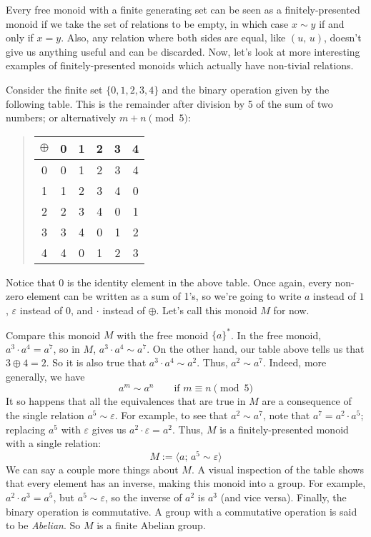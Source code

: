 \documentclass[../generics]{subfiles}
\begin{document}
Every free monoid with a finite generating set can be seen as a finitely-presented monoid if we take the set of relations to be empty, in which case $x\sim y$ if and only if $x=y$. Also, any relation where both sides are equal, like $(u,\,u)$, doesn't give us anything useful and can be discarded. Now, let's look at more interesting examples of finitely-presented monoids which actually have non-tivial relations.
\begin{example}
Consider the finite set $\{0,1,2,3,4\}$ and the binary operation given by the following table. This is the remainder after division by 5 of the sum of two numbers; or alternatively $m+n \pmod 5$:
\begin{quote}
\begin{tabular}{c|c|c|c|c|c}
$\oplus$&0&1&2&3&4\\
\hline
0&0&1&2&3&4\\
\hline
1&1&2&3&4&0\\
\hline
2&2&3&4&0&1\\
\hline
3&3&4&0&1&2\\
\hline
4&4&0&1&2&3
\end{tabular}
\end{quote}
Notice that 0 is the identity element in the above table. Once again, every non-zero element can be written as a sum of 1's, so we're going to write $a$ instead of $1$, $\varepsilon$ instead of $0$, and $\cdot$ instead of $\oplus$. Let's call this monoid $M$ for now.

Compare this monoid $M$ with the free monoid $\{a\}^*$. In the free monoid, $a^3\cdot a^4=a^7$, so in $M$, $a^3\cdot a^4\sim a^7$. On the other hand, our table above tells us that $3\oplus 4=2$. So it is also true that $a^3\cdot a^4\sim a^2$. Thus, $a^2\sim a^7$. Indeed, more generally, we have
\[a^m\sim a^n\qquad\text{if $m\equiv n \pmod 5$}\]
It so happens that all the equivalences that are true in $M$ are a consequence of the single relation $a^5\sim \varepsilon$. For example, to see that $a^2\sim a^7$, note that $a^7=a^2\cdot a^5$; replacing $a^5$ with $\varepsilon$ gives us $a^2\cdot\varepsilon=a^2$. Thus, $M$ is a finitely-presented monoid with a single relation:
\[M := \langle a;\,a^5\sim\varepsilon\rangle\]
We can say a couple more things about $M$. A visual inspection of the table shows that every element has an inverse, making this monoid into a group. For example, $a^2\cdot a^3=a^5$, but $a^5\sim\varepsilon$, so the inverse of $a^2$ is $a^3$ (and vice versa). Finally, the binary operation is commutative. A group with a commutative operation is said to be \emph{Abelian}. So $M$ is a finite Abelian group.
\end{example}
\end{document}
